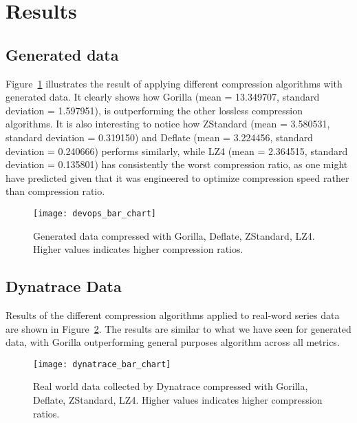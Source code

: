 \section{Results}
\subsection{Generated data}
Figure~\ref{devops_lossless_compression} illustrates the result of applying different compression algorithms
with generated data. It clearly shows how Gorilla (mean = 13.349707, standard deviation = 1.597951), is outperforming the other
lossless compression algorithms.
It is also interesting to notice how ZStandard (mean = 3.580531, standard deviation = 0.319150) and Deflate
(mean = 3.224456, standard deviation = 0.240666)
performs similarly, while LZ4 (mean = 2.364515, standard deviation = 0.135801) has
consistently the worst compression ratio, as one might have predicted given that it was engineered to optimize compression speed rather
than compression ratio.

\begin{figure}[!htbp]
\begin{center}
\texttt{[image: devops\_bar\_chart]}
\caption[compression]{Generated data compressed with Gorilla, Deflate, ZStandard, LZ4.
Higher values indicates higher compression ratios.}
\label{devops_lossless_compression}
\end{center}
\end{figure}

\subsection{Dynatrace Data}
Results of the different compression algorithms applied to real-word series data are shown in
Figure~\ref{dynatrace_compression}. The results are similar to what we have seen for generated data,
with Gorilla outperforming general purposes algorithm across all metrics.

\begin{figure}[!htbp]
\begin{center}
\texttt{[image: dynatrace\_bar\_chart]}
\caption[compression]{Real world data collected by Dynatrace compressed with Gorilla, Deflate, ZStandard, LZ4.
Higher values indicates higher compression ratios.}
\label{dynatrace_compression}
\end{center}
\end{figure}

